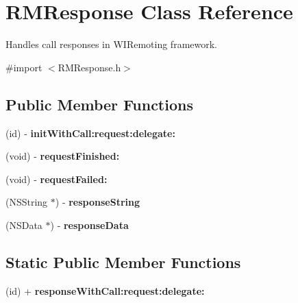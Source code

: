 \hypertarget{interface_r_m_response}{
\section{RMResponse Class Reference}
\label{interface_r_m_response}
}


Handles call responses in WIRemoting framework.  


{\ttfamily \#import $<$RMResponse.h$>$}\subsection*{Public Member Functions}
\begin{DoxyCompactItemize}
\item 
\hypertarget{interface_r_m_response_ac669acc6552f783a8ab46f1404a307d6}{
(id) -\/ {\bfseries initWithCall:request:delegate:}}
\label{interface_r_m_response_ac669acc6552f783a8ab46f1404a307d6}

\item 
\hypertarget{interface_r_m_response_a9c0cb2ff676b85a95a880810222dc38e}{
(void) -\/ {\bfseries requestFinished:}}
\label{interface_r_m_response_a9c0cb2ff676b85a95a880810222dc38e}

\item 
\hypertarget{interface_r_m_response_a72bce836d142fbe400db06a9683e9d64}{
(void) -\/ {\bfseries requestFailed:}}
\label{interface_r_m_response_a72bce836d142fbe400db06a9683e9d64}

\item 
\hypertarget{interface_r_m_response_a647ba0ba05412d71c6cf8bd144b656ef}{
(NSString $\ast$) -\/ {\bfseries responseString}}
\label{interface_r_m_response_a647ba0ba05412d71c6cf8bd144b656ef}

\item 
\hypertarget{interface_r_m_response_a945e816c61e871826ef46689cd78d857}{
(NSData $\ast$) -\/ {\bfseries responseData}}
\label{interface_r_m_response_a945e816c61e871826ef46689cd78d857}

\end{DoxyCompactItemize}
\subsection*{Static Public Member Functions}
\begin{DoxyCompactItemize}
\item 
\hypertarget{interface_r_m_response_ada22bb0cc944b2d3db0d22b556a24daf}{
(id) + {\bfseries responseWithCall:request:delegate:}}
\label{interface_r_m_response_ada22bb0cc944b2d3db0d22b556a24daf}

\end{DoxyCompactItemize}
